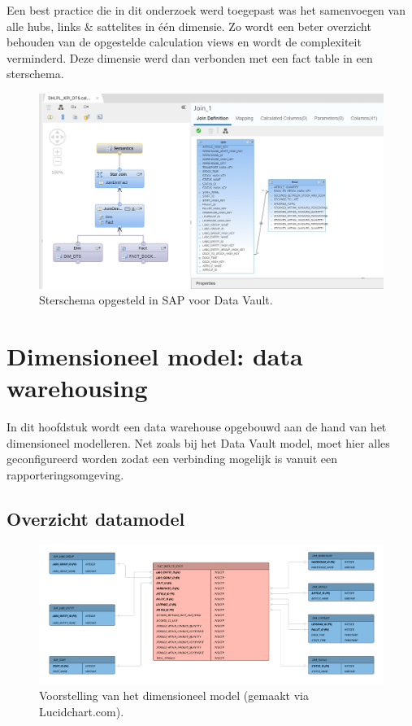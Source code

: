 Een best practice die in dit onderzoek werd toegepast was het samenvoegen van alle hubs, links \& sattelites in één dimensie. Zo wordt een beter overzicht behouden van de opgestelde calculation views en wordt de complexiteit verminderd. Deze dimensie werd dan verbonden met een fact table in een sterschema. 

\begin{figure}[h]
	\centering
	\includegraphics[scale=0.5]{../images/DV_FG_datamart.png}
	\caption{Sterschema opgesteld in SAP voor Data Vault.}
	\label{fig:dvdm}
\end{figure}

\section{Dimensioneel model: data warehousing}
\label{ch:dimmodel}
In dit hoofdstuk wordt een data warehouse opgebouwd aan de hand van het dimensioneel modelleren. Net zoals bij het Data Vault model, moet hier alles geconfigureerd worden zodat een verbinding mogelijk is vanuit een rapporteringsomgeving.

\subsection{Overzicht datamodel}
\begin{figure}[h]
	\centering
	\includegraphics[scale=0.5]{../images/Dimensioneelmodel.png}
	\caption{Voorstelling van het dimensioneel model (gemaakt via Lucidchart.com).}
	\label{fig:dmdm}
\end{figure}

